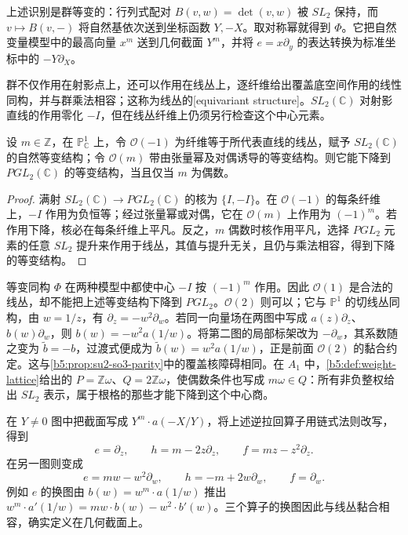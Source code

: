 上述识别是群等变的：行列式配对 \(B(v,w)=\det(v,w)\) 被 \(SL_2\) 保持，而 \(v\mapsto B(v,-)\) 将自然基依次送到坐标函数 \(Y,-X\)。取对称幂就得到 \(\Phi\)。它把自然变量模型中的最高向量 \(x^m\) 送到几何截面 \(Y^m\)，并将 \(e=x\partial_y\) 的表达转换为标准坐标中的 \(-Y\partial_X\)。

\ProseParagraphBreak
群不仅作用在射影点上，还可以作用在线丛上，逐纤维给出覆盖底空间作用的线性同构，并与群乘法相容；这称为线丛的[equivariant structure]。\(SL_2(\mathbb C)\) 对射影直线的作用零化 \(-I\)，但在线丛纤维上仍须另行检查这个中心元素。

\begin{proposition}\label{b5:prop:projective-line-equivariant-descent}
	设 \(m\in\mathbb Z\)，在 \(\mathbb P^1_{\mathbb C}\) 上，令 \(\mathcal O(-1)\) 为纤维等于所代表直线的线丛，赋予 \(SL_2(\mathbb C)\) 的自然等变结构；令 \(\mathcal O(m)\) 带由张量幂及对偶诱导的等变结构。则它能下降到 \(PGL_2(\mathbb C)\) 的等变结构，当且仅当 \(m\) 为偶数。
\end{proposition}
\begin{proof}
	满射 \(SL_2(\mathbb C)\to PGL_2(\mathbb C)\) 的核为 \(\{I,-I\}\)。在 \(\mathcal O(-1)\) 的每条纤维上，\(-I\) 作用为负恒等；经过张量幂或对偶，它在 \(\mathcal O(m)\) 上作用为 \((-1)^m\)。若作用下降，核必在每条纤维上平凡。反之，\(m\) 偶数时核作用平凡，选择 \(PGL_2\) 元素的任意 \(SL_2\) 提升来作用于线丛，其值与提升无关，且仍与乘法相容，得到下降的等变结构。
\end{proof}

等变同构 \(\Phi\) 在两种模型中都使中心 \(-I\) 按 \((-1)^m\) 作用。因此 \(\mathcal O(1)\) 是合法的线丛，却不能把上述等变结构下降到 \(PGL_2\)。\(\mathcal O(2)\) 则可以；它与 \(\mathbb P^1\) 的切线丛同构，由 \(w=1/z\)，有 \(\partial_z=-w^2\partial_w\)。若同一向量场在两图中写成 \(a(z)\partial_z\)、\(b(w)\partial_w\)，则 \(b(w)=-w^2a(1/w)\)。将第二图的局部标架改为 \(-\partial_w\)，其系数随之变为 \(\widetilde b=-b\)，过渡式便成为 \(\widetilde b(w)=w^2a(1/w)\)，正是前面 \(\mathcal O(2)\) 的黏合约定。这与\cref{b5:prop:su2-so3-parity}中的覆盖核障碍相同。在 \(A_1\) 中，\cref{b5:def:weight-lattice}给出的 \(P=\mathbb Z\omega\)、\(Q=2\mathbb Z\omega\)，使偶数条件也写成 \(m\omega\in Q\)：所有非负整权给出 \(SL_2\) 表示，属于根格的那些才能下降到这个中心商。

\ProseParagraphBreak
在 \(Y\ne0\) 图中把截面写成 \(Y^m\cdot a(-X/Y)\)，将上述逆拉回算子用链式法则改写，得到
\[
	e=\partial_z,\qquad h=m-2z\partial_z,\qquad f=mz-z^2\partial_z.
\]
在另一图则变成
\[
	e=mw-w^2\partial_w,\qquad h=-m+2w\partial_w,\qquad f=\partial_w.
\]
例如 \(e\) 的换图由 \(b(w)=w^m\cdot a(1/w)\) 推出 \(w^m\cdot a'(1/w)=mw\cdot b(w)-w^2\cdot b'(w)\)。三个算子的换图因此与线丛黏合相容，确实定义在几何截面上。

